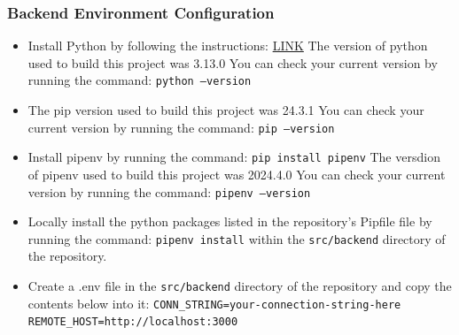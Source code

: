 \documentclass{article}
\begin{document}
        \subsubsection{Backend Environment Configuration}
            \begin{itemize}
                \item Install Python by following the instructions:
                \href{https://www.python.org/downloads/}{LINK}
                \newline The version of python used to build this project
                was 3.13.0
                \newline You can check your current version by running the command:
                \newline \texttt{python --version}
                \item The pip version used to build this project was 24.3.1
                \newline You can check your current version by running the command:
                \newline \texttt{pip --version}
                \item Install pipenv by running the command:
                \newline \texttt{pip install pipenv}
                \newline The versdion of pipenv used to build this project was 2024.4.0
                \newline You can check your current version by running the command:
                \newline \texttt{pipenv --version}
                \item Locally install the python packages listed in the repository's 
                Pipfile file by running the command:
                \newline \texttt{pipenv install}
                \newline within the \texttt{src/backend} directory of the 
                repository.
                \item Create a .env file in the \texttt{src/backend} directory
                of the repository and copy the contents below into it:
                \newline \texttt{CONN\_STRING=your-connection-string-here}
                \newline \texttt{REMOTE\_HOST=http://localhost:3000}
            \end{itemize}
\end{document}
